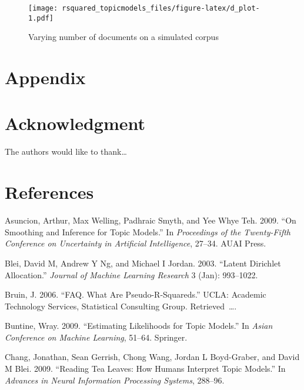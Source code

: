 \documentclass[conference,final,]{IEEEtran}
\makeatletter
\def\maxwidth{\ifdim\Gin@nat@width>\linewidth\linewidth
\else\Gin@nat@width\fi}
\let\Oldincludegraphics\includegraphics
\renewcommand{\includegraphics}[1]{\Oldincludegraphics[width=\maxwidth]{#1}}
\makeatother
\begin{document}
\begin{figure}
\centering
\texttt{[image: rsquared\_topicmodels\_files/figure-latex/d\_plot-1.pdf]}
\caption{Varying number of documents on a simulated corpus}
\end{figure}

\newpage

\hypertarget{appendix}{%
\section{Appendix}\label{appendix}}

\newpage

\hypertarget{acknowledgment}{%
\section{Acknowledgment}\label{acknowledgment}}

The authors would like to thank\ldots{}

\newpage

\hypertarget{references}{%
\section*{References}\label{references}}

\hypertarget{refs}{}
\leavevmode\hypertarget{ref-asuncion2009smoothing}{}%
Asuncion, Arthur, Max Welling, Padhraic Smyth, and Yee Whye Teh. 2009.
``On Smoothing and Inference for Topic Models.'' In \emph{Proceedings of
the Twenty-Fifth Conference on Uncertainty in Artificial Intelligence},
27--34. AUAI Press.

\leavevmode\hypertarget{ref-blei2003latent}{}%
Blei, David M, Andrew Y Ng, and Michael I Jordan. 2003. ``Latent
Dirichlet Allocation.'' \emph{Journal of Machine Learning Research} 3
(Jan): 993--1022.

\leavevmode\hypertarget{ref-bruin2006faq}{}%
Bruin, J. 2006. ``FAQ. What Are Pseudo-R-Squareds.'' UCLA: Academic
Technology Services, Statistical Consulting Group. Retrieved~\ldots{}.

\leavevmode\hypertarget{ref-buntine2009estimating}{}%
Buntine, Wray. 2009. ``Estimating Likelihoods for Topic Models.'' In
\emph{Asian Conference on Machine Learning}, 51--64. Springer.

\leavevmode\hypertarget{ref-chang2009reading}{}%
Chang, Jonathan, Sean Gerrish, Chong Wang, Jordan L Boyd-Graber, and
David M Blei. 2009. ``Reading Tea Leaves: How Humans Interpret Topic
Models.'' In \emph{Advances in Neural Information Processing Systems},
288--96.
\end{document}
